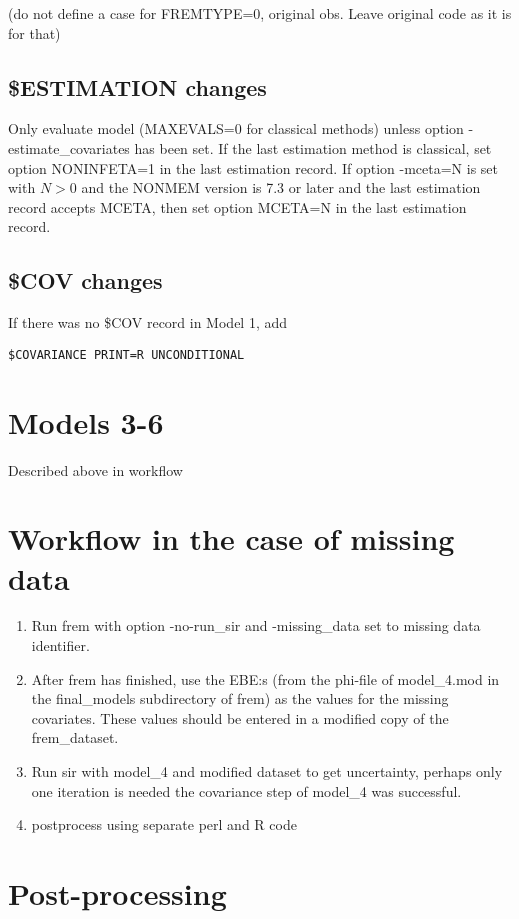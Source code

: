(do not define a case for FREMTYPE=0, original obs. Leave original code as it is for that)


\subsection{\$ESTIMATION changes}
Only evaluate model (MAXEVALS=0 for classical methods) unless option -estimate\_covariates has been
set. If the last estimation method is classical, set option NONINFETA=1 in the last estimation record.
If option -mceta=N is set with $N>0$ and the NONMEM version is 7.3 or later and
the last estimation record accepts MCETA, then set option MCETA=N in the last estimation record.
\subsection{\$COV changes}
If there was no \$COV record in Model 1, add
\begin{verbatim}
$COVARIANCE PRINT=R UNCONDITIONAL
\end{verbatim}


\section{Models 3-6}

Described above in workflow

\section{Workflow in the case of missing data}

\begin{enumerate}
\item Run frem with option -no-run\_sir and -missing\_data set to missing data identifier.
\item After frem has finished, use the EBE:s (from the phi-file of model\_4.mod in the final\_models subdirectory of frem)
as the values for the missing covariates. These values should be entered in a modified copy of the frem\_dataset.
\item Run sir with model\_4 and modified dataset to get uncertainty, perhaps only one iteration is needed
the covariance step of model\_4 was successful.
\item postprocess using separate perl and R code
\end{enumerate}

\section{Post-processing}

